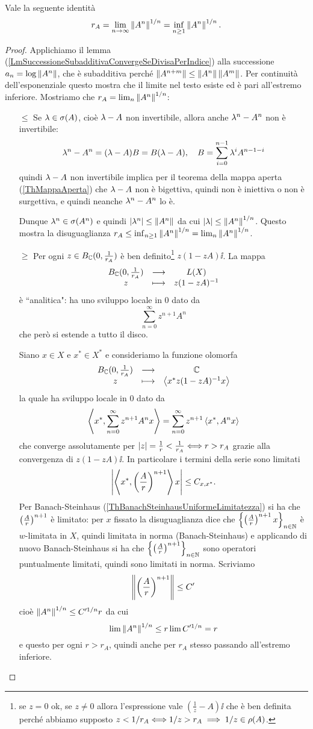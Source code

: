 \begin{proposition}\label{FormulaCauchyHadamardGelfand}
Vale la seguente identit\`a
\[r_A=\lim_{n\to\infty}\left\Vert{A^n}\right\Vert^{1/n}=\inf_{n\geq 1}\left\Vert{A^n}\right\Vert^{1/n}.\]
\end{proposition}
\begin{proof}
Applichiamo il lemma (\ref{LmSuccessioneSubadditivaConvergeSeDivisaPerIndice}) alla successione $a_n=\log\left\Vert{A^n}\right\Vert$, che \`e subadditiva perch\'e $\left\Vert{A^{n+m}}\right\Vert\leq \left\Vert{A^n}\right\Vert\left\Vert{A^m}\right\Vert$. Per continuit\`a dell'esponenziale questo mostra che il limite nel testo esiste ed \`e pari all'estremo inferiore.
Mostriamo che $r_A=\lim_{n}\left\Vert{A^n}\right\Vert^{1/n}$: 
\setlength{\leftmargini}{0cm}
\begin{itemize}
\item[$\boxed{\leq}$] Se $\lambda\in \sigma(A)$, cio\`e $\lambda-A$ non invertibile, allora anche $\lambda^n-A^n$ non \`e invertibile:
\[\lambda^n-A^n=(\lambda-A)B=B(\lambda-A),\quad B=\sum_{i=0}^{n-1}\lambda^iA^{n-1-i}\]
quindi $\lambda-A$ non invertibile implica per il teorema della mappa aperta (\ref{ThMappaAperta}) che $\lambda-A$ non \`e bigettiva, quindi non \`e iniettiva o non \`e surgettiva, e quindi neanche $\lambda^n-A^n$ lo \`e.


Dunque $\lambda^n\in \sigma(A^n)$ e quindi $\left|{\lambda^n}\right|\leq \left\Vert{A^n}\right\Vert$ da cui $\left|{\lambda}\right|\leq \left\Vert{A^n}\right\Vert^{1/n}$.
Questo mostra la disuguaglianza $r_A\leq \inf_{n\geq 1}\left\Vert{A^n}\right\Vert^{1/n}=\lim_{n}\left\Vert{A^n}\right\Vert^{1/n}$.
\item[$\boxed{\geq}$] Per ogni $z\in B_{\mathbb{C}}(0,\frac1{r_A})$ \`e ben definito\footnote{se $z=0$ ok, se $z\neq 0$ allora l'espressione vale $(\frac1z-A)\ii$ che \`e ben definita perch\'e abbiamo supposto $z<1/r_A\Longleftrightarrow 1/z>r_A\implies 1/z\in \rho(A)$.} $z(1-zA)\ii$. La mappa
\[\begin{array}{ccc} {B_{\mathbb{C}}(0,\frac1{r_A})} & \longrightarrow & {L(X)}\\ {z} & \longmapsto & {z(1-zA)^{-1}} \end{array}\]
\`e ``analitica": ha uno sviluppo locale in $0$ dato da
\[\sum_{n=0}^\infty z^{n+1}A^n\]
che per\`o si estende a tutto il disco. 

Siano $x\in X$ e $x^\ast\in X^\ast$ e consideriamo la funzione olomorfa
\[\begin{array}{ccc} {B_{\mathbb{C}}(0,\frac1{r_A})} & \longrightarrow & {\mathbb{C}}\\ {z} & \longmapsto & {\left\langle {x^\ast z(1-zA)^{-1}x}\right\rangle} \end{array}\]
la quale ha sviluppo locale in $0$ dato da
\[\left\langle {x^\ast,\sum_{n=0}^\infty z^{n+1}A^nx}\right\rangle=\sum_{n=0}^\infty z^{n+1}\left\langle {x^\ast,A^nx}\right\rangle\]
che converge assolutamente per $\left|{z}\right|=\frac1r<\frac1{r_A}\Longleftrightarrow r>r_A$ grazie alla convergenza di $z(1-zA)\ii$. In particolare i termini della serie sono limitati
\[\left|{\left\langle {x^\ast,\left({\frac A r}\right)^{n+1}}\right\rangle x}\right|\leq C_{x,x^\ast}.\]
Per Banach-Steinhaus (\ref{ThBanachSteinhausUniformeLimitatezza}) si ha che $\left({\frac A r}\right)^{n+1}$ \`e limitato: per $x$ fissato la disuguaglianza dice che $\left\{{\left({\frac A r}\right)^{n+1} x}\right\}_{n\in \mathbb{N}}$ \`e $w$-limitata in $X$, quindi limitata in norma (Banach-Steinhaus) e applicando di nuovo Banach-Steinhaus si ha che $\left\{{\left({\frac A r}\right)^{n+1} }\right\}_{n\in \mathbb{N}}$ sono operatori puntualmente limitati, quindi sono limitati in norma. Scriviamo
\[\left\Vert{\left({\frac A r}\right)^{n+1}}\right\Vert\leq C'\]
cio\`e $\left\Vert{A^n}\right\Vert^{1/n}\leq C'^{1/n}r$ da cui
\[\lim \left\Vert{A^n}\right\Vert^{1/n}\leq r\lim C'^{1/n}=r\]
e questo per ogni $r>r_A$, quindi anche per $r_A$ stesso passando all'estremo inferiore.
\end{itemize}
\setlength{\leftmargini}{0.5cm}
\end{proof}

